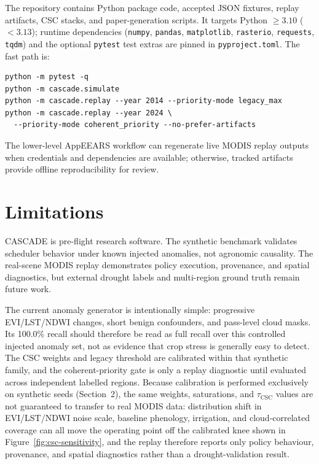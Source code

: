 \documentclass[11pt]{article}
\begin{document}
The repository contains Python package code, accepted JSON fixtures, replay artifacts, CSC stacks, and paper-generation scripts. It targets Python $\geq 3.10$ ($<3.13$); runtime dependencies (\texttt{numpy}, \texttt{pandas}, \texttt{matplotlib}, \texttt{rasterio}, \texttt{requests}, \texttt{tqdm}) and the optional \texttt{pytest} test extras are pinned in \texttt{pyproject.toml}. The fast path is:
\begin{verbatim}
python -m pytest -q
python -m cascade.simulate
python -m cascade.replay --year 2014 --priority-mode legacy_max
python -m cascade.replay --year 2024 \
  --priority-mode coherent_priority --no-prefer-artifacts
\end{verbatim}
The lower-level AppEEARS workflow can regenerate live MODIS replay outputs when credentials and dependencies are available; otherwise, tracked artifacts provide offline reproducibility for review.

\section{Limitations}

CASCADE is pre-flight research software. The synthetic benchmark validates scheduler behavior under known injected anomalies, not agronomic causality. The real-scene MODIS replay demonstrates policy execution, provenance, and spatial diagnostics, but external drought labels and multi-region ground truth remain future work.

The current anomaly generator is intentionally simple: progressive EVI/LST/NDWI changes, short benign confounders, and pass-level cloud masks. Its 100.0\% recall should therefore be read as full recall over this controlled injected anomaly set, not as evidence that crop stress is generally easy to detect. The CSC weights and legacy threshold are calibrated within that synthetic family, and the coherent-priority gate is only a replay diagnostic until evaluated across independent labelled regions. Because calibration is performed exclusively on synthetic seeds (Section~2), the same weights, saturations, and $\tau_\mathrm{CSC}$ values are not guaranteed to transfer to real MODIS data: distribution shift in EVI/LST/NDWI noise scale, baseline phenology, irrigation, and cloud-correlated coverage can all move the operating point off the calibrated knee shown in Figure~\ref{fig:csc-sensitivity}, and the replay therefore reports only policy behaviour, provenance, and spatial diagnostics rather than a drought-validation result.
\end{document}
